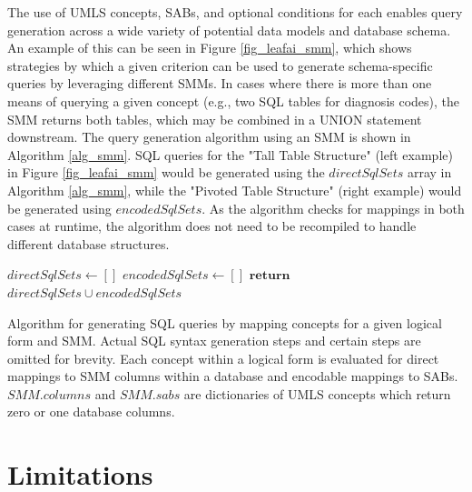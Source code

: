 \documentclass[../main.tex]{subfiles}
\begin{document}
The use of UMLS concepts, SABs, and optional conditions for each enables query generation across a wide variety of potential data models and database schema. An example of this can be seen in Figure \ref{fig_leafai_smm}, which shows strategies by which a given criterion can be used to generate schema-specific queries by leveraging different SMMs. In cases where there is more than one means of querying a given concept (e.g., two SQL tables for diagnosis codes), the SMM returns both tables, which may be combined in a UNION statement downstream. The query generation algorithm using an SMM is shown in Algorithm \ref{alg_smm}. SQL queries for the "Tall Table Structure" (left example) in Figure \ref{fig_leafai_smm} would be generated using the $directSqlSets$ array in Algorithm \ref{alg_smm}, while the "Pivoted Table Structure" (right example) would be generated using $encodedSqlSets$. As the algorithm checks for mappings in both cases at runtime, the algorithm does not need to be recompiled to handle different database structures.


\begin{algorithm}
\DontPrintSemicolon
$directSqlSets \gets []$ 
$encodedSqlSets \gets []$ 
\BlankLine
{}
$\textbf{return}$ $directSqlSets \cup encodedSqlSets$\;
\caption{Algorithm for generating SQL queries by mapping concepts for a given logical form and SMM. Actual SQL syntax generation steps and certain steps are omitted for brevity. Each concept within a logical form is evaluated for direct mappings to SMM columns within a database and encodable mappings to SABs. $SMM.columns$ and $SMM.sabs$ are dictionaries of UMLS concepts which return zero or one database columns.}\label{alg_smm}
\end{algorithm}

\section{Limitations}
\end{document}
